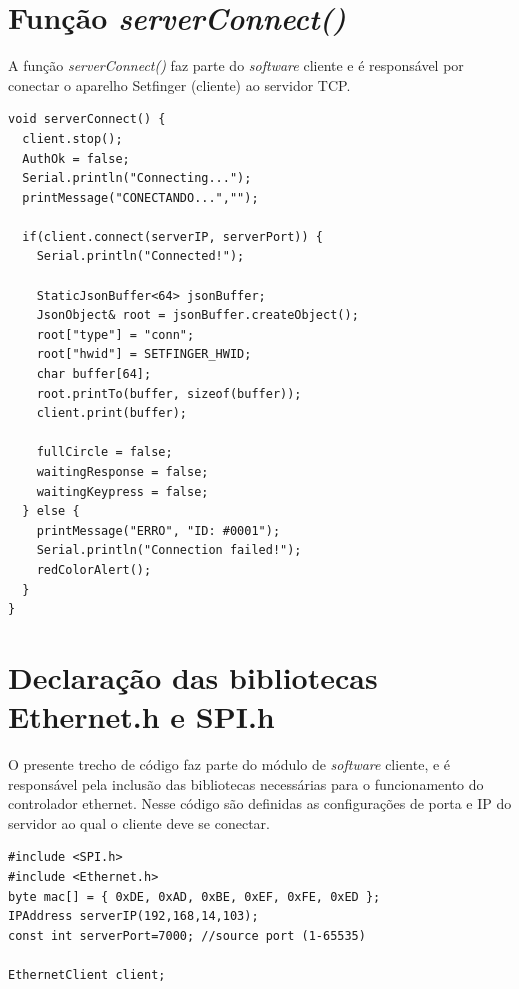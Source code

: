 \renewcommand\appendixname{Apêndice}
\appendix
{}




\chapter{Função \textit{serverConnect()} \label{apendice_conectar}}

A função \textit{serverConnect()} faz parte do \textit{software} cliente e é responsável por conectar o aparelho Setfinger (cliente) ao servidor TCP.

\begin{lstlisting}
void serverConnect() {  
  client.stop();
  AuthOk = false;
  Serial.println("Connecting...");
  printMessage("CONECTANDO...","");

  if(client.connect(serverIP, serverPort)) {
    Serial.println("Connected!");

    StaticJsonBuffer<64> jsonBuffer;                    
    JsonObject& root = jsonBuffer.createObject();
    root["type"] = "conn";
    root["hwid"] = SETFINGER_HWID;
    char buffer[64];
    root.printTo(buffer, sizeof(buffer)); 
    client.print(buffer);
    
    fullCircle = false;
    waitingResponse = false;
    waitingKeypress = false;
  } else {
    printMessage("ERRO", "ID: #0001");
    Serial.println("Connection failed!");
    redColorAlert();
  }
}
\end{lstlisting}



\chapter{Declaração das bibliotecas Ethernet.h e SPI.h \label{apendice_ethernet}}
O presente trecho de código faz parte do módulo de \textit{software} cliente, e é responsável pela inclusão das bibliotecas necessárias para o funcionamento do controlador ethernet. Nesse código são definidas as configurações de porta e IP do servidor ao qual o cliente deve se conectar.

\begin{lstlisting}
#include <SPI.h> 
#include <Ethernet.h>
byte mac[] = { 0xDE, 0xAD, 0xBE, 0xEF, 0xFE, 0xED };
IPAddress serverIP(192,168,14,103); 
const int serverPort=7000; //source port (1-65535)

EthernetClient client;
\end{lstlisting}



